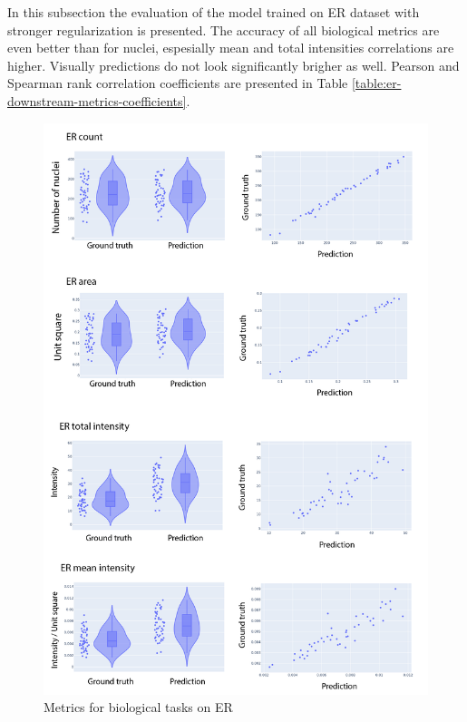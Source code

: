 In this subsection the evaluation of the model trained on ER dataset with stronger regularization is presented. The accuracy of all biological metrics are even better than for nuclei, espesially mean and total intensities correlations are higher. Visually predictions do not look significantly brigher as well. Pearson and Spearman rank correlation coefficients are presented in Table \ref{table:er-downstream-metrics-coefficients}.

\begin{figure}[htb]
	\begin{center}
		\includegraphics[width=\linewidth]{bilder/ER/metrics/combined-metrics.png}
		\caption{Metrics for biological tasks on ER}\label{fig:er-downstream-metrics}
	\end{center}
\end{figure}

